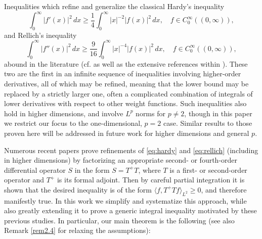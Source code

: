 \documentclass[reqno,10pt,centertags]{amsart}
\numberwithin{equation}{section}
\theoremstyle{remark}
\begin{document}
Inequalities which refine and generalize the classical Hardy's inequality
\begin{equation}\label{eq:hardy}
    \int_0^\infty |f'(x)|^2\,dx \geq \frac{1}{4}\int_0^\infty |x|^{-2}|f(x)|^2\,dx,\quad f\in C_0^\infty((0,\infty)),
\end{equation}    
and Rellich's inequality
\begin{equation}\label{eq:rellich}
    \int_0^\infty |f''(x)|^2\,dx \geq \frac{9}{16}\int_0^\infty |x|^{-4}|f(x)|^2\,dx,\quad f\in C_0^\infty((0,\infty)),
\end{equation}    
abound in the literature (cf. \cite{BEL15,GM13,KPS17} as well as the extensive references within \cite{GPPS23}). These two are the first in an infinite sequence of inequalities involving higher-order derivatives, all of which may be refined, meaning that the lower bound may be replaced by a strictly larger one, often a complicated combination of integrals of lower derivatives with respect to other weight functions. Such inequalities also hold in higher dimensions, and involve $L^p$ norms for $p \neq 2$, though in this paper we restrict our focus to the one-dimensional, $p=2$ case. Similar results to those proven here will be addressed in future work for higher dimensions and general $p$.

Numerous recent papers \cite{GL18,GNP23,GPPS23,GPS21,GPS24} prove refinements of \ref{eq:hardy} and \ref{eq:rellich} (including in higher dimensions) by factorizing an appropriate second- or fourth-order differential operator $S$ in the form $S=T^+T$, where $T$ is a first- or second-order operator and $T^+$ is its formal adjoint. Then by careful partial integration it is shown that the desired inequality is of the form $\langle f,T^+T f\rangle_{L^2} \geq 0$, and therefore manifestly true. In this work we simplify and systematize this approach, while also greatly extending it to  prove a generic integral inequality motivated by these previous studies. In particular, our main theorem is the following (see also Remark \ref{rem2.4} for relaxing the assumptions):
\end{document}
